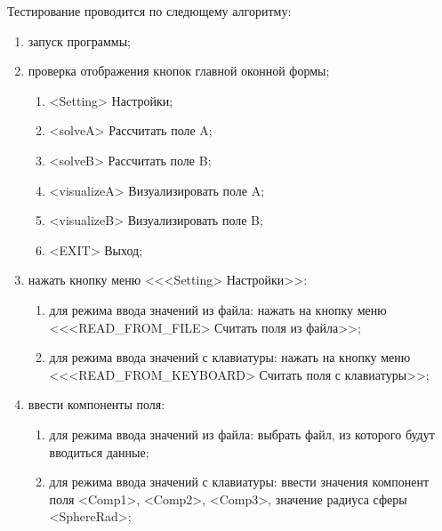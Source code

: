 \documentclass[14pt,a4paper,final]{extreport}
\begin{document}
Тестирование проводится по следющему алгоритму:
\begin{enumerate}[label=\arabic*.]
\item запуск программы;
    \item проверка отображения кнопок главной оконной формы;
    \begin{enumerate}[label*=\arabic*.,
                      leftmargin=1.5cm, %
                      labelsep=0.5cm] %
    \item <Setting> Настройки;
    \item <solveA> Рассчитать поле A;
     \item <solveB> Рассчитать поле B;
    \item <visualizeA> Визуализировать поле A;
    \item <visualizeB> Визуализировать поле B;
     \item <EXIT> Выход;
    \end{enumerate}

\item нажать кнопку меню <<<Setting> Настройки>>:
    \begin{enumerate}[label*=\arabic*.,
                      leftmargin=1.5cm, %
                      labelsep=0.5cm] %

    \item для режима ввода значений из файла: нажать на кнопку меню <<<READ\_FROM\_FILE> Считать поля из файла>>;
    \item для режима ввода значений с клавиатуры: нажать на кнопку меню <<<READ\_FROM\_KEYBOARD> Считать поля с клавиатуры>>;
    \end{enumerate}

\item ввести компоненты поля:
    \begin{enumerate}[label*=\arabic*.,
                      leftmargin=1.5cm, %
                      labelsep=0.5cm] %

    \item для режима ввода значений из файла: выбрать файл, из которого будут вводиться данные;
    \item для режима ввода значений с клавиатуры: ввести значения компонент поля <Comp1>, <Comp2>, <Comp3>, значение радиуса сферы <SphereRad>;
    \end{enumerate}


\end{enumerate}
\end{document}
